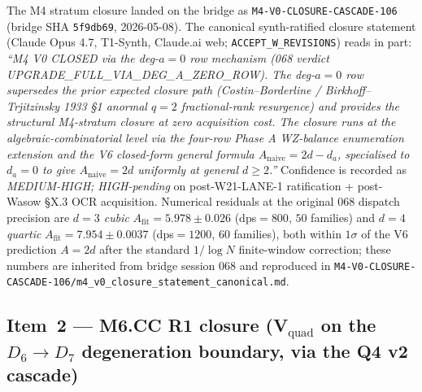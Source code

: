 \documentclass[11pt,a4paper]{article}
\theoremstyle{definition}
\theoremstyle{remark}
\begin{document}
The M4 stratum closure landed on the bridge as
\texttt{M4-V0-CLOSURE-CASCADE-106} (bridge SHA \texttt{5f9db69},
2026-05-08). The canonical synth-ratified closure statement (Claude
Opus 4.7, T1-Synth, Claude.ai web; \verb|ACCEPT_W_REVISIONS|) reads
in part:
\emph{``M4 V0 CLOSED via the deg-$a=0$ row mechanism (068 verdict
\textsf{UPGRADE\_FULL\_VIA\_DEG\_A\_ZERO\_ROW}). The deg-$a=0$ row
supersedes the prior expected closure path
(Costin--Borderline / Birkhoff--Trjitzinsky 1933 \S 1 anormal
$q=2$ fractional-rank resurgence) and provides the structural
M4-stratum closure at zero acquisition cost. The closure runs at the
algebraic-combinatorial level via the four-row Phase A WZ-balance
enumeration extension and the V6 closed-form general formula
$A_{\mathrm{naive}} = 2d - d_a$, specialised to $d_a = 0$ to give
$A_{\mathrm{naive}} = 2d$ uniformly at general $d \geq 2$.''}
Confidence is recorded as \emph{MEDIUM-HIGH; HIGH-pending} on
post-W21-LANE-1 ratification + post-Wasow \S X.3 OCR acquisition.
Numerical residuals at the original 068 dispatch precision are
\emph{$d=3$ cubic} $A_{\mathrm{fit}} = 5.978 \pm 0.026$ (dps$=800$,
$50$ families) and \emph{$d=4$ quartic}
$A_{\mathrm{fit}} = 7.954 \pm 0.0037$ (dps$=1200$, $60$ families),
both within $1\sigma$ of the V6 prediction $A = 2d$ after the
standard $1/\log N$ finite-window correction; these numbers are
inherited from bridge session 068 and reproduced in
\texttt{M4-V0-CLOSURE-CASCADE-106/m4\_v0\_closure\_statement\_canonical.md}.

\subsection{Item~2 --- M6.CC R1 closure (V$_{\mathrm{quad}}$ on the $D_6 \to D_7$ degeneration boundary, via the Q4 v2 cascade)}
\label{sec:closure-cascade-m6}
\end{document}
